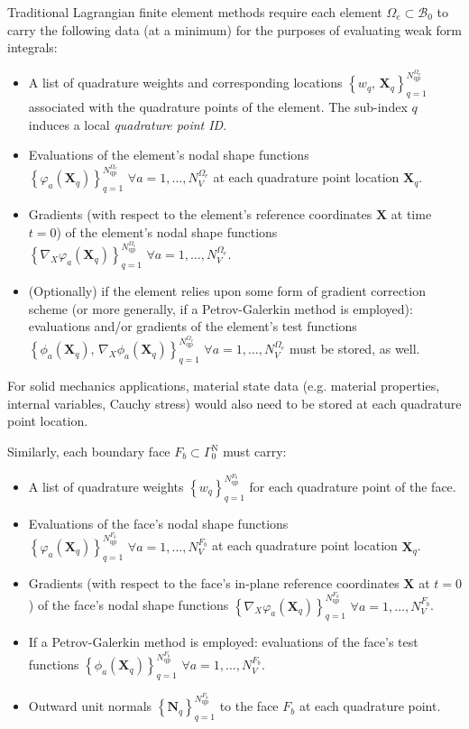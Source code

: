 	Traditional Lagrangian finite element methods require each element $\Omega_e \subset \mathcal{B}_0$ to carry the following data (at a minimum) for the purposes of evaluating weak form integrals:
	\begin{itemize}
		\item A list of quadrature weights and corresponding locations $\left\{ w_q, \, \bm{X}_q \right\}_{q=1}^{N^{\Omega_e}_{\mathrm q\mathrm p}}$ associated with the quadrature points of the element. The sub-index $q$ induces a local \textit{quadrature point ID}.
		\item Evaluations of the element's nodal shape functions $\left\{ \varphi_a (\bm{X}_q) \right\}_{q=1}^{N^{\Omega_e}_{\mathrm q\mathrm p}} \, \, \forall a = 1, \ldots, N^{\Omega_e}_V$ at each quadrature point location $\bm{X}_q$.
		\item Gradients (with respect to the element's reference coordinates $\bm{X}$ at time $t = 0$) of the element's nodal shape functions $\left\{ \nabla_X \varphi_a (\bm{X}_q) \right\}_{q=1}^{N^{\Omega_e}_{\mathrm q\mathrm p}} \, \, \forall a = 1, \ldots, N^{\Omega_e}_V$.
		\item (Optionally) if the element relies upon some form of gradient correction scheme (or more generally, if a Petrov-Galerkin method is employed): evaluations and/or gradients of the element's test functions $\left\{ \phi_a (\bm{X}_q), \, \nabla_X \phi_a (\bm{X}_q) \right\}_{q=1}^{N^{\Omega_e}_{\mathrm q\mathrm p}} \, \, \forall a = 1, \ldots, N^{\Omega_e}_V$ must be stored, as well.
	\end{itemize}
	For solid mechanics applications, material state data (e.g. material properties, internal variables, Cauchy stress) would also need to be stored at each quadrature point location.
	
	Similarly, each boundary face $F_b \subset \Gamma^{\mathrm N}_0$ must carry:
	\begin{itemize}
		\item A list of quadrature weights $\left\{ w_q \right\}_{q=1}^{N^{F_b}_{\mathrm q\mathrm p}}$ for each quadrature point of the face.
		\item Evaluations of the face's nodal shape functions $\left\{ \varphi_a (\bm{X}_q) \right\}_{q=1}^{N^{F_b}_{\mathrm q\mathrm p}} \, \, \forall a = 1, \ldots, N^{F_b}_V$ at each quadrature point location $\bm{X}_q$.
		\item Gradients (with respect to the face's in-plane reference coordinates $\bm{X}$ at $t = 0$) of the face's nodal shape functions $\left\{ \nabla_X \varphi_a (\bm{X}_q) \right\}_{q=1}^{N^{F_b}_{\mathrm q\mathrm p}} \, \, \forall a = 1, \ldots, N^{F_b}_V$.
		\item If a Petrov-Galerkin method is employed: evaluations of the face's test functions $\left\{ \phi_a (\bm{X}_q) \right\}_{q=1}^{N^{F_b}_{\mathrm q\mathrm p}} \, \, \forall a = 1, \ldots, N^{F_b}_V$.
		\item Outward unit normals $\left\{ \bm{N}_q \right\}_{q=1}^{N^{F_b}_{\mathrm q\mathrm p}}$ to the face $F_b$ at each quadrature point.
	\end{itemize}
	
